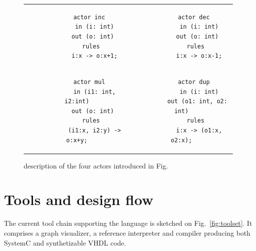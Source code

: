 \begin{figure}[h]
  \centering
  \begin{tabular}[c]{cc}
    \begin{minipage}[c]{0.45\linewidth}
      \begin{lstlisting}
        actor inc 
          in (i: int)
         out (o: int)
        rules
          i:x -> o:x+1;
      \end{lstlisting}
    \end{minipage} &
    \begin{minipage}[c]{0.45\linewidth}
      \begin{lstlisting}
        actor dec 
          in (i: int)
         out (o: int)
        rules
          i:x -> o:x-1;
      \end{lstlisting}
    \end{minipage} \\
    \begin{minipage}[c]{0.45\linewidth}
      \begin{lstlisting}
        actor mul 
          in (i1: int, i2:int)
         out (o: int)
        rules
          (i1:x, i2:y) -> o:x+y;
      \end{lstlisting}
    \end{minipage} &
    \begin{minipage}[c]{0.45\linewidth}
      \begin{lstlisting}
        actor dup 
          in (i: int)
         out (o1: int, o2: int)
        rules
          i:x -> (o1:x, o2:x);
      \end{lstlisting}
    \end{minipage}
  \end{tabular}
  \caption{\caph description of the four actors introduced in Fig.~\label{fig:fouractorsdesc}}
\end{figure}



\section{Tools and design flow}

The current tool chain supporting the \caph language is sket\-ched on Fig.~\ref{fig:toolset}. It
comprises a graph visualizer, a reference interpreter and compiler producing both SystemC
and synthetizable VHDL code.

